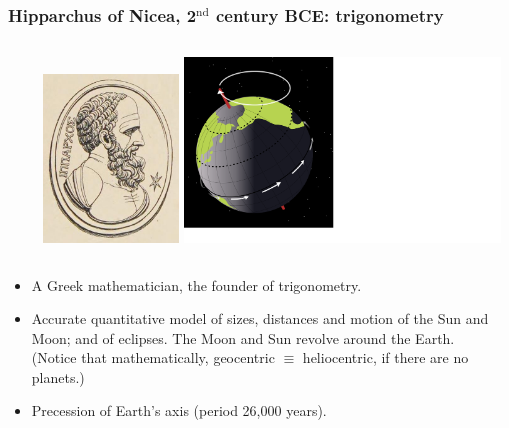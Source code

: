 \documentclass[aspectratio=169,xcolor=pdftex,dvipsnames]{beamer} %
\begin{document}
\begin{frame}
\frametitle{Hipparchus of Nicea, 2$^{\text{nd}}$ century BCE: trigonometry}

\centering
\begin{columns}
\ \ \ \ \ \includegraphics[width=36mm]{hipparchus.jpg}            
\vspace{4mm} \includegraphics[width=84mm]{earthPrecession.pdf} 
\end{columns} 
 
\begin{itemize}
\item
A Greek mathematician, the founder of trigonometry.
\item
Accurate quantitative model of sizes, distances and motion of the Sun and Moon; and of eclipses.
The Moon and Sun revolve around the Earth.\\
(Notice that mathematically, geocentric $\equiv$ heliocentric, if there are  no planets.)
\item
Precession of Earth's axis (period 26,000 years).
\end{itemize}
 
\end{frame}
\end{document}
